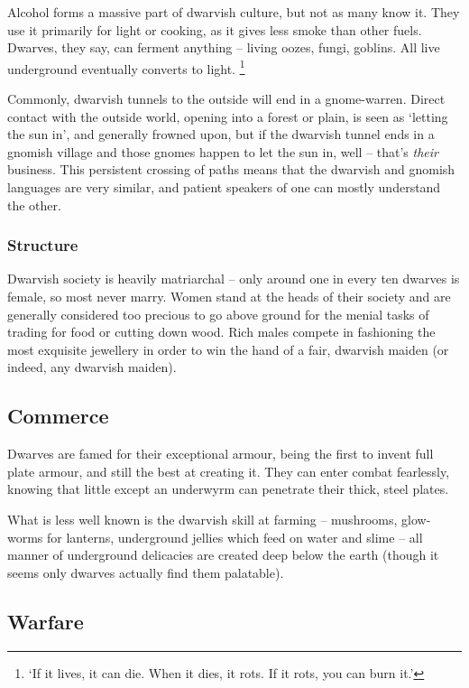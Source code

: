 \begin{multicols}{2}
Alcohol forms a massive part of dwarvish culture, but not as many know it.
They use it primarily for light or cooking, as it gives less smoke than other fuels.
Dwarves, they say, can ferment anything -- living oozes, fungi, goblins.
All live underground eventually converts to light.%
\footnote{`If it lives, it can die. When it dies, it rots. If it rots, you can burn it.'}

Commonly, dwarvish tunnels to the outside will end in a gnome-warren.
Direct contact with the outside world, opening into a forest or plain, is seen as `letting the sun in',
and generally frowned upon, but if the dwarvish tunnel ends in a gnomish village and those gnomes happen to let the sun in, well -- that's \emph{their} business.
This persistent crossing of paths means that the dwarvish and gnomish languages are very similar, and patient speakers of one can mostly understand the other.

\subsubsection{Structure}
Dwarvish society is heavily matriarchal -- only around one in every ten dwarves is female, so most never marry.
Women stand at the heads of their society and are generally considered too precious to go above ground for the menial tasks of trading for food or cutting down wood.
Rich males compete in fashioning the most exquisite jewellery in order to win the hand of a fair, dwarvish maiden (or indeed, any dwarvish maiden).

\subsection{Commerce}

Dwarves are famed for their exceptional armour, being the first to invent full plate armour, and still the best at creating it.
They can enter combat fearlessly, knowing that little except an underwyrm can penetrate their thick, steel plates.

What is less well known is the dwarvish skill at farming -- mushrooms, glow-worms for lanterns, underground jellies which feed on water and slime -- all manner of underground delicacies are created deep below the earth (though it seems only dwarves actually find them palatable).

\subsection{Warfare}


\end{multicols}

